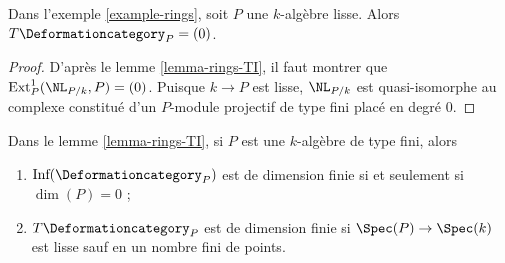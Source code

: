 \begin{lemma}
\label{lemma-smooth}
Dans l'exemple \ref{example-rings}, soit $P$ une $k$-algèbre lisse. Alors
$T\Deformationcategory_P = (0)$.
\end{lemma}

\begin{proof}
D'après le lemme \ref{lemma-rings-TI}, il faut montrer que
$\text{Ext}^1_P(\NL_{P/k}, P) = (0)$.
Puisque $k \to P$ est lisse, $\NL_{P/k}$ est quasi-isomorphe au
complexe constitué d'un
$P$-module projectif de type fini placé en degré $0$.
\end{proof}

\begin{lemma}
\label{lemma-finite-type-rings-TI}
Dans le lemme \ref{lemma-rings-TI}, si $P$ est une $k$-algèbre de type fini, alors
\begin{enumerate}
\item $\text{Inf}(\Deformationcategory_P)$ est de dimension finie si et seulement si
$\dim(P) = 0$ ;
\item $T\Deformationcategory_P$ est de dimension finie si
$\Spec(P) \to \Spec(k)$ est lisse sauf en un nombre fini de points.
\end{enumerate}
\end{lemma}

